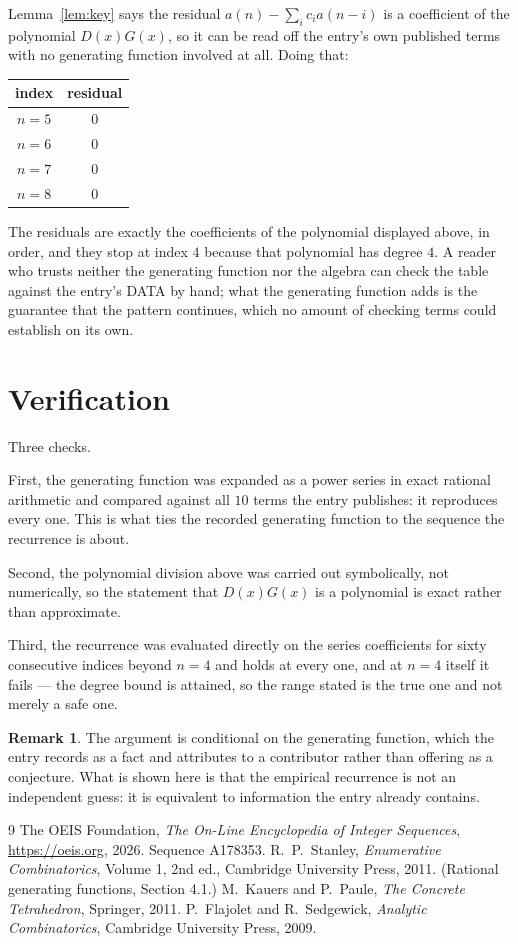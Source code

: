 \documentclass[11pt,a4paper]{article}
\theoremstyle{plain}
\theoremstyle{definition}
\newtheorem{remark}[theorem]{Remark}
\begin{document}
Lemma~\ref{lem:key} says the residual $a(n)-\sum_ic_ia(n-i)$ is a coefficient of the
polynomial $D(x)G(x)$, so it can be read off the entry's own published terms with no
generating function involved at all. Doing that:
\begin{center}
\begin{tabular}{cc}
index & residual \\ \hline
$n=5$ & $0$ \\
$n=6$ & $0$ \\
$n=7$ & $0$ \\
$n=8$ & $0$
\end{tabular}
\end{center}
The residuals are exactly the coefficients of the polynomial displayed above, in order, and
they stop at index $4$ because that polynomial has degree $4$. A reader who trusts
neither the generating function nor the algebra can check the table against the entry's DATA
by hand; what the generating function adds is the guarantee that the pattern continues, which
no amount of checking terms could establish on its own.

\section{Verification}

Three checks.

First, the generating function was expanded as a power series in exact rational arithmetic and
compared against all $10$ terms the entry publishes: it reproduces every one. This is
what ties the recorded generating function to the sequence the recurrence is about.

Second, the polynomial division above was carried out symbolically, not numerically, so the
statement that $D(x)G(x)$ is a polynomial is exact rather than approximate.

Third, the recurrence was evaluated directly on the series coefficients for sixty consecutive
indices beyond $n=4$ and holds at every one, and at $n=4$ itself it fails --- the
degree bound is attained, so the range stated is the true one and not merely a safe one.

\begin{remark}
The argument is conditional on the generating function, which the entry records as a fact and
attributes to a contributor rather than offering as a conjecture. What is shown here is that
the empirical recurrence is not an independent guess: it is equivalent to information the
entry already contains.
\end{remark}

\begin{thebibliography}{9}
 The OEIS Foundation, \emph{The On-Line Encyclopedia of Integer
Sequences}, \url{https://oeis.org}, 2026. Sequence A178353.
 R.~P.~Stanley, \emph{Enumerative Combinatorics}, Volume 1, 2nd ed.,
Cambridge University Press, 2011. (Rational generating functions, Section 4.1.)
 M.~Kauers and P.~Paule, \emph{The Concrete Tetrahedron}, Springer, 2011.
 P.~Flajolet and R.~Sedgewick, \emph{Analytic Combinatorics}, Cambridge
University Press, 2009.
\end{thebibliography}
\end{document}
